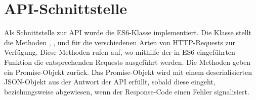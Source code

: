 \section{API-Schnittstelle}
\label{sec:f_api_schnittstelle}

Als Schnittstelle zur API wurde die ES6-Klasse  implementiert.  Die
Klasse stellt die Methoden , ,  und
 für die verschiedenen Arten von HTTP-Requests zur Verfügung.
Diese Methoden rufen  auf, wo mithilfe der in ES6 eingeführten
Funktion  die entsprechenden Requests ausgeführt werden.  Die
Methoden geben ein Promise-Objekt zurück.  Das Promise-Objekt wird mit einem
deserialisierten JSON-Objekt aus der Antwort der API erfüllt, sobald diese
eingeht, beziehungsweise abgewiesen, wenn der Response-Code einen Fehler
signalisiert.
